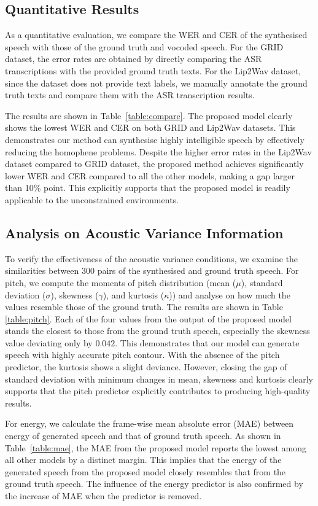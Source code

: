 \documentclass[letterpaper]{article} %
\begin{document}
\subsection{Quantitative Results}
As a quantitative evaluation, we compare the WER and CER of the synthesised speech with those of the ground truth and vocoded speech.
For the GRID dataset, the error rates are obtained by directly comparing the ASR transcriptions with the provided ground truth texts.
For the Lip2Wav dataset, since the dataset does not provide text labels, we manually annotate the ground truth texts and compare them with the ASR transcription results. 

The results are shown in Table~\ref{table:compare}. 
The proposed model clearly shows the lowest WER and CER on both GRID and Lip2Wav datasets. 
This demonstrates our method can synthesise highly intelligible speech by effectively reducing the homophene problems.
Despite the higher error rates in the Lip2Wav dataset compared to GRID dataset, the proposed method achieves significantly lower WER and CER compared to all the other models, making a gap larger than 10\% point.
This explicitly supports that the proposed model is readily applicable to the unconstrained environments.


\subsection{Analysis on Acoustic Variance Information} 

To verify the effectiveness of the acoustic variance conditions, we examine the similarities between $300$ pairs of the synthesised and ground truth speech.
For pitch, we compute the moments of pitch distribution (mean ($\mu$), standard deviation ($\sigma$), skewness ($\gamma$), and kurtosis ($\kappa$)) and analyse on how much the values resemble those of the ground truth.
The results are shown in Table \ref{table:pitch}.
Each of the four values from the output of the proposed model stands the closest to those from the ground truth speech, especially the skewness value deviating only by $0.042$. This demonstrates that our model can generate speech with highly accurate pitch contour.
With the absence of the pitch predictor, the kurtosis shows a slight deviance. 
However, closing the gap of standard deviation with minimum changes in mean, skewness and kurtosis clearly supports that the pitch predictor explicitly contributes to producing high-quality results.

For energy, we calculate the frame-wise mean absolute error (MAE) between energy of generated speech and that of ground truth speech.
As shown in Table~\ref{table:mae}, the MAE from the proposed model reports the lowest among all other models by a distinct margin. 
This implies that the energy of the generated speech from the proposed model closely resembles that from the ground truth speech.
The influence of the energy predictor is also confirmed by the increase of MAE when the predictor is removed.
\end{document}
